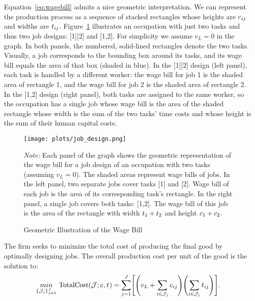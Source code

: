 \documentclass{article}
\theoremstyle{plain}
\theoremstyle{plain}
\begin{document}
Equation~\ref{eq:wagebill} admits a nice geometric interpretation.  
We can represent the production process as a sequence of stacked rectangles whose heights are $c_{ij}$ and widths are $t_{ij}$.  
Figure~\ref{fig:wage_bill} illustrates an occupation with just two tasks and thus two job designs: [1][2] and [1,2].
For simplicity we assume $v_L=0$ in the graph.
In both panels, the numbered, solid‐lined rectangles denote the two tasks.
Visually, a job corresponds to the bounding box around its tasks, and its wage bill equals the area of that box (shaded in blue).
In the [1][2] design (left panel), each task is handled by a different worker: the wage bill for job 1 is the shaded area of rectangle 1, and the wage bill for job 2 is the shaded area of rectangle 2.  
In the [1,2] design (right panel), both tasks are assigned to the same worker, so the occupation has a single job whose wage bill is the area of the shaded rectangle whose width is the sum of the two tasks’ time costs and whose height is the sum of their human capital costs.  
\begin{figure}[h!]
  \caption{Geometric Illustration of the Wage Bill} 
  \label{fig:wage_bill}
  \begin{center}
    \texttt{[image: plots/job\_design.png]}
  \end{center}
  \begin{footnotesize}
    \emph{Note:} Each panel of the graph shows the geometric representation of the wage bill for a job design of an occupation with two tasks (assuming $v_L=0$).  
    The shaded areas represent wage bills of jobs. 
    In the left panel, two separate jobs cover tasks [1] and [2].
    Wage bill of each job is the area of its corresponding task's rectangle.
    In the right panel, a single job covers both tasks: [1,2].
    The wage bill of this job is the area of the rectangle with width $t_{1}+t_{2}$ and height $c_{1}+c_{2}$.
  \end{footnotesize}
\end{figure}

The firm seeks to minimize the total cost of producing the final good by optimally designing jobs.
The overall production cost per unit of the good is the solution to:
\begin{align}
\label{eq:totalcost_no_handoff}
\underset{\{\mathcal{J}_j\}_{j=1}^J}{min} \ 
\text{TotalCost}(\mathcal{J}; \hccost{}, \timecost{})
= 
\sum_{j=1}^J \Biggl[\Biggl(v_L + \sum_{i \in \mathcal{J}_j} \hccost{ij} \Biggr) \Biggl(\sum_{i \in \mathcal{J}_j} \timecost{ij} \Biggr)\Biggr].
\end{align}
\end{document}
